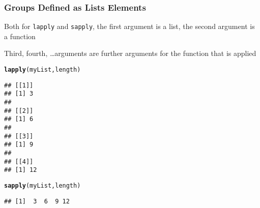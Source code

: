 \documentclass[paper=screen,mathserif]{beamer}\usepackage[]{graphicx}\usepackage[]{color}
\makeatletter
\newcommand{\hlstd}[1]{\textcolor[rgb]{0.345,0.345,0.345}{#1}}%
\newcommand{\hlkwd}[1]{\textcolor[rgb]{0.737,0.353,0.396}{\textbf{#1}}}%
\newenvironment{kframe}{%
 \def\at@end@of@kframe{}%
 \ifinner\ifhmode%
  \def\at@end@of@kframe{\end{minipage}}%
  \begin{minipage}{\columnwidth}%
 \fi\fi%
 \def\FrameCommand##1{\hskip\@totalleftmargin \hskip-\fboxsep
 \colorbox{shadecolor}{##1}\hskip-\fboxsep
     \hskip-\linewidth \hskip-\@totalleftmargin \hskip\columnwidth}%
 \MakeFramed {\advance\hsize-\width
   \@totalleftmargin\z@ \linewidth\hsize
   \@setminipage}}%
 {\par\unskip\endMakeFramed%
 \at@end@of@kframe}
\newenvironment{knitrout}{}{} %
\newcommand{\ft}[1]{\frametitle{#1}}
\makeatother
\begin{document}
\begin{frame}[fragile]
  \ft{Groups Defined as Lists Elements}

  {\small Both for \verb=lapply= and \verb=sapply=, the first argument
    is a list, the second argument is a function
    
    Third, fourth, \dots arguments are further arguments for the
    function that is applied}
\begin{knitrout}\scriptsize
{}\color{fgcolor}\begin{kframe}
\begin{alltt}
\hlkwd{lapply}\hlstd{(myList, length)}
\end{alltt}
\begin{verbatim}
## [[1]]
## [1] 3
## 
## [[2]]
## [1] 6
## 
## [[3]]
## [1] 9
## 
## [[4]]
## [1] 12
\end{verbatim}
\end{kframe}
\end{knitrout}


\begin{knitrout}\scriptsize
{}\color{fgcolor}\begin{kframe}
\begin{alltt}
\hlkwd{sapply}\hlstd{(myList, length)}
\end{alltt}
\begin{verbatim}
## [1]  3  6  9 12
\end{verbatim}
\end{kframe}
\end{knitrout}

\end{frame}
\end{document}
